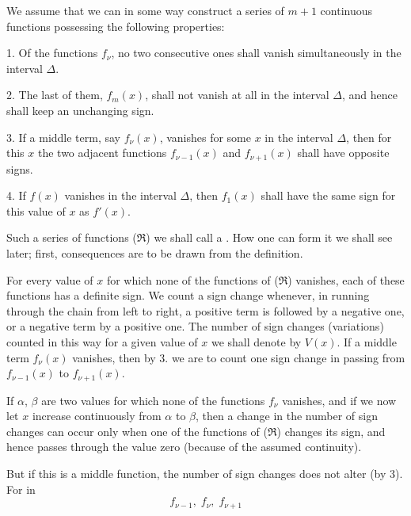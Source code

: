 We assume that we can in some way construct a series of $m + 1$ continuous functions
possessing the following properties:

1. Of the functions $f_\nu$, no two consecutive ones shall vanish simultaneously in the interval $\Delta$.

2. The last of them, $f_m(x)$, shall not vanish at all in the interval $\Delta$, and hence shall keep an unchanging sign.

3. If a middle term, say $f_\nu(x)$, vanishes for some $x$ in the interval $\Delta$, then for this $x$ the two adjacent functions $f_{\nu-1}(x)$ and $f_{\nu+1}(x)$ shall have opposite signs.

4. If $f(x)$ vanishes in the interval $\Delta$, then $f_1(x)$ shall have the same sign for this value of $x$ as $f'(x)$.

Such a series of functions ($\mathfrak{R}$) we shall call a . How one can form it we shall see later; first, consequences are to be drawn from the definition.

For every value of $x$ for which none of the functions of ($\mathfrak{R}$) vanishes, each of these functions has a definite sign. We count a sign change whenever, in running through the chain from left to right, a positive term is followed by a negative one, or a negative term by a positive one. The number of sign changes (variations) counted in this way for a given value of $x$ we shall denote by $V(x)$. If a middle term $f_\nu(x)$ vanishes, then by 3. we are to count one sign change in passing from $f_{\nu-1}(x)$ to $f_{\nu+1}(x)$.

If $\alpha$, $\beta$ are two values for which none of the functions $f_\nu$ vanishes, and if we now let $x$ increase continuously from $\alpha$ to $\beta$, then a change in the number of sign changes can occur only when one of the functions of ($\mathfrak{R}$) changes its sign, and hence passes through the value zero (because of the assumed continuity).

But if this is a middle function, the number of sign changes does not alter (by 3). For in
\[
f_{\nu-1}, \; f_\nu, \; f_{\nu+1}
\]
